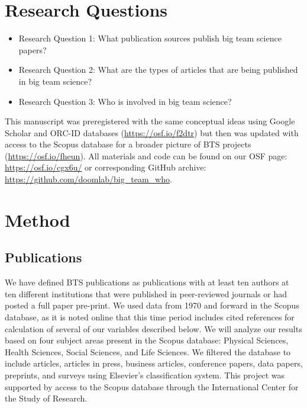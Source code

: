 \documentclass[
  man,floatsintext]{apa6}
\providecommand{\tightlist}{%
  \setlength{\itemsep}{0pt}\setlength{\parskip}{0pt}}
\begin{document}
\hypertarget{research-questions}{%
\section{Research Questions}\label{research-questions}}

\begin{itemize}
\tightlist
\item
  Research Question 1: What publication sources publish big team
  science papers?
\item
  Research Question 2: What are the types of articles that are being
  published in big team science?
\item
  Research Question 3: Who is involved in big team science?
\end{itemize}

This manuscript was preregistered with the same conceptual ideas using
Google Scholar and ORC-ID databases (\url{https://osf.io/f2dtr}) but then
was updated with access to the Scopus database for a broader picture of
BTS projects (\url{https://osf.io/fheun}). All materials and code can be
found on our OSF page: \url{https://osf.io/cgx6u/} or corresponding GitHub
archive: \url{https://github.com/doomlab/big_team_who}.

\hypertarget{method}{%
\section{Method}\label{method}}

\hypertarget{publications}{%
\subsection{Publications}\label{publications}}

We have defined BTS publications as publications with at least ten
authors at ten different institutions that were published in
peer-reviewed journals or had posted a full paper pre-print. We used
data from 1970 and forward in the Scopus database, as it is noted online
that this time period includes cited references for calculation of
several of our variables described below. We will analyze our results
based on four subject areas present in the Scopus database: Physical
Sciences, Health Sciences, Social Sciences, and Life Sciences. We
filtered the database to include articles, articles in press, business
articles, conference papers, data papers, preprints, and surveys using
Elsevier's classification system. This project was supported by access
to the Scopus database through the International Center for the Study of
Research.
\end{document}
